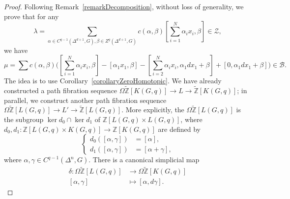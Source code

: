 \documentclass[10pt,a4paper]{amsart}
\newcommand{\ZZ}{{\mathbb Z}}
\newcommand{\tZ}{{\widetilde{\mathbb Z}}}
\begin{document}
\begin{proof}
	Following Remark~\ref{remarkDecomposition}, without loss of generality, we prove that for any
	\begin{equation}
		\lambda=\sum_{\alpha\in C^{q-1}(\Delta^{d+1},G),\beta\in Z^q(\Delta^{d+1},G)} c(\alpha,\beta)[\sum_{i=1}^N \alpha_ix_i,\beta]\in \mathcal{Z},
	\end{equation}
	we have
	\begin{equation}
		\mu=\sum c(\alpha,\beta)\bigg([\sum_{i=1}^N \alpha_ix_i,\beta]-[\alpha_1x_1,\beta]-[\sum_{i=2}^N \alpha_ix_i,\alpha_1dx_1+\beta]+[0,\alpha_1dx_1+\beta]\bigg)\in \mathcal{B}.
	\end{equation}
	The idea is to use Corollary~\ref{corollaryZeroHomotopic}. We have already constructed a path fibration sequence $\Omega\tZ[K(G,q)]\rightarrow L\rightarrow \tZ[K(G,q)]$; in parallel, we construct another path fibration sequence $\Omega\tZ[L(G,q)]\rightarrow L'\rightarrow \tZ[L(G,q)]$. More explicitly, the $\Omega\tZ[L(G,q)]$ is the subgroup $\ker d_0\cap \ker d_1$ of $\ZZ[L(G,q)\times L(G,q)]$, where 
	$d_0,d_1:\ZZ[L(G,q)\times K(G,q)]\rightarrow \ZZ[K(G,q)]$ are defined by
	\begin{equation}
		\left\{
		\begin{aligned}
			d_0([\alpha,\gamma]) &= [\alpha],\\
			d_1([\alpha,\gamma]) &= [\alpha+\gamma],
		\end{aligned}
		\right.
	\end{equation}
	where $\alpha,\gamma\in C^{q-1}(\Delta^n,G)$. There is a canonical simplicial map
	\begin{equation}
		\begin{aligned}
			\delta : \Omega\tZ[L(G,q)]&\rightarrow \Omega\tZ[K(G,q)]\\
			[\alpha,\gamma]&\mapsto[\alpha,d\gamma].
		\end{aligned}		
	\end{equation}
	

\end{proof}
\end{document}
